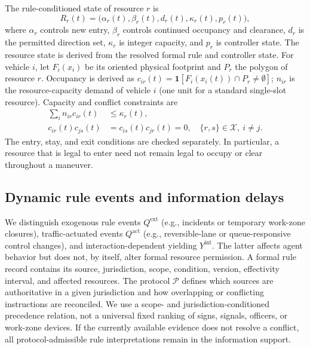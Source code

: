 \documentclass[letterpaper]{article} %
\begin{document}
The rule-conditioned state of resource $r$ is
\begin{equation}
R_r(t)=\big(\alpha_r(t),\beta_r(t),d_r(t),\kappa_r(t),p_r(t)\big),
\label{eq:resource-state}
\end{equation}
where $\alpha_r$ controls new entry, $\beta_r$ controls continued occupancy and clearance, $d_r$ is the permitted direction set, $\kappa_r$ is integer capacity, and $p_r$ is controller state. The resource state is derived from the resolved formal rule and controller state. For vehicle $i$, let $F_i(x_i)$ be its oriented physical footprint and $P_r$ the polygon of resource $r$. Occupancy is derived as $c_{ir}(t)=\mathbf 1[F_i(x_i(t))\cap P_r\ne\emptyset]$; $n_{ir}$ is the resource-capacity demand of vehicle $i$ (one unit for a standard single-slot resource). Capacity and conflict constraints are
\begin{equation}
\begin{aligned}
\sum_i n_{ir}c_{ir}(t)&\leq\kappa_r(t),\\
c_{ir}(t)c_{js}(t)&=c_{is}(t)c_{jr}(t)=0,\quad \{r,s\}\in\mathcal X,\ i\ne j.
\end{aligned}
\label{eq:resource-feas}
\end{equation}
The entry, stay, and exit conditions are checked separately. In particular, a resource that is legal to enter need not remain legal to occupy or clear throughout a maneuver.

\subsection{Dynamic rule events and information delays}
We distinguish exogenous rule events $Q^{\mathrm{ext}}$ (e.g., incidents or temporary work-zone closures), traffic-actuated events $Q^{\mathrm{act}}$ (e.g., reversible-lane or queue-responsive control changes), and interaction-dependent yielding $Y^{\mathrm{int}}$. The latter affects agent behavior but does not, by itself, alter formal resource permission. A formal rule record contains its source, jurisdiction, scope, condition, version, effectivity interval, and affected resources. The protocol $\mathcal P$ defines which sources are authoritative in a given jurisdiction and how overlapping or conflicting instructions are reconciled. We use a scope- and jurisdiction-conditioned precedence relation, not a universal fixed ranking of signs, signals, officers, or work-zone devices. If the currently available evidence does not resolve a conflict, all protocol-admissible rule interpretations remain in the information support.
\end{document}
